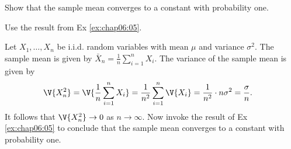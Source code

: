 	
	\begin{exercise}
		Show that the sample mean converges to a constant with probability one. 
		\begin{hint}
			Use the result from Ex \ref{ex:chap06:05}.
		\end{hint}
		\begin{solution}
			Let $X_1, \ldots, X_n$ be i.i.d. random variables with mean $\mu$ and variance $\sigma^2$. The sample mean is given by $\bar{X}_n = \frac{1}{n} \sum_{i = 1}^n X_i$. The variance of the sample mean is given by
			\begin{align*}
				\V{X_n^2} & = \V{\frac{1}{n} \sum_{i = 1}^n X_i} = \frac{1}{n^2} \sum_{i = 1}^n \V{X_i} = \frac{1}{n^2} \cdot n \sigma^2 = \frac{\sigma}{n}.
			\end{align*}	
			It follows that $\V{X_n^2} \to 0$ as $n \to \infty$. Now invoke the result of Ex \ref{ex:chap06:05} to conclude that the sample mean converges to a constant with probability one.
		\end{solution}
	\end{exercise}
	

